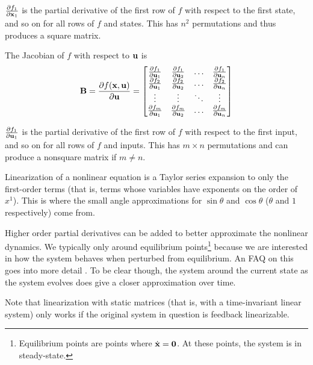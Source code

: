 $\frac{\partial f_1}{\partial \mathbf{x}_1}$ is the partial derivative of the first
row of $f$ with respect to the first state, and so on for all rows of $f$ and
states. This has $n^2$ permutations and thus produces a square matrix.

The Jacobian of $f$ with respect to $\mathbf{u}$ is
\begin{equation*}
  \mathbf{B} = \frac{\partial f(\mathbf{x}, \mathbf{u})}{\partial \mathbf{u}} =
  \begin{bmatrix}
    \frac{\partial f_1}{\partial \mathbf{u}_1} &
      \frac{\partial f_1}{\partial \mathbf{u}_2} & \hdots &
      \frac{\partial f_1}{\partial \mathbf{u}_n} \\
    \frac{\partial f_2}{\partial \mathbf{u}_1} &
      \frac{\partial f_2}{\partial \mathbf{u}_2} & \hdots &
      \frac{\partial f_2}{\partial \mathbf{u}_n} \\
    \vdots & \vdots & \ddots & \vdots \\
    \frac{\partial f_m}{\partial \mathbf{u}_1} &
      \frac{\partial f_m}{\partial \mathbf{u}_2} & \hdots &
      \frac{\partial f_m}{\partial \mathbf{u}_n}
  \end{bmatrix}
\end{equation*}

$\frac{\partial f_1}{\partial \mathbf{u}_1}$ is the partial derivative of the first
row of $f$ with respect to the first input, and so on for all rows of $f$ and
inputs. This has $m \times n$ permutations and can produce a nonsquare matrix if
$m \neq n$.

Linearization of a nonlinear equation is a Taylor series expansion to only the
first-order terms (that is, terms whose variables have exponents on the order of
$x^1$). This is where the small angle approximations for $\sin\theta$ and
$\cos\theta$ ($\theta$ and $1$ respectively) come from.

Higher order partial derivatives can be added to better approximate the
nonlinear dynamics. We typically only  around
equilibrium points\footnote{Equilibrium points are points where
$\dot{\mathbf{x}} = \mathbf{0}$. At these points, the system is in steady-state.}
because we are interested in how the \gls{system} behaves when perturbed from
equilibrium. An FAQ on this goes into more detail
\cite{bib:linearize_equilibrium_point}. To be clear though,
 the \gls{system} around the current
\gls{state} as the \gls{system} evolves does give a closer approximation over
time.

Note that linearization with static matrices (that is, with a time-invariant
linear \gls{system}) only works if the original \gls{system} in question is
feedback linearizable.
